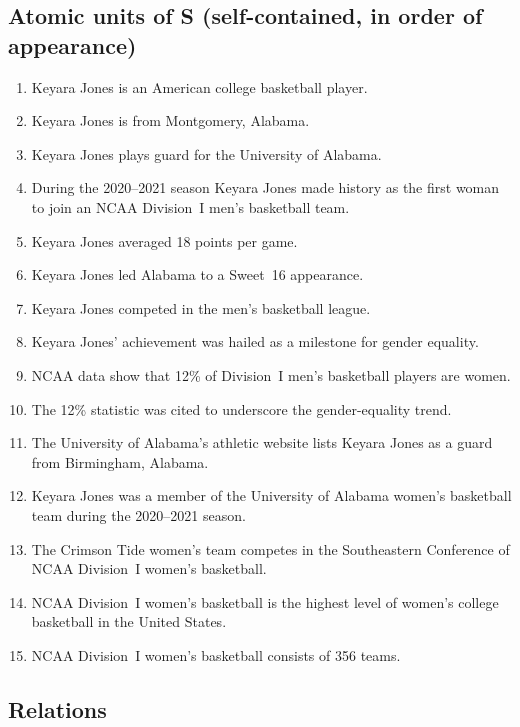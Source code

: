 \documentclass[11pt]{article}
\begin{document}
\subsection*{Atomic units of S (self-contained, in order of appearance)}
\begin{enumerate}[label=\textbf{S\arabic*.},leftmargin=*]
  \item Keyara Jones is an American college basketball player.
  \item Keyara Jones is from Montgomery, Alabama.
  \item Keyara Jones plays guard for the University of Alabama.
  \item During the 2020--2021 season Keyara Jones made history as the first woman to join an NCAA Division~I men's basketball team.
  \item Keyara Jones averaged 18 points per game.
  \item Keyara Jones led Alabama to a Sweet~16 appearance.
  \item Keyara Jones competed in the men's basketball league.
  \item Keyara Jones' achievement was hailed as a milestone for gender equality.
  \item NCAA data show that 12\% of Division~I men's basketball players are women.
  \item The 12\% statistic was cited to underscore the gender-equality trend.
  \item The University of Alabama's athletic website lists Keyara Jones as a guard from Birmingham, Alabama.
  \item Keyara Jones was a member of the University of Alabama women's basketball team during the 2020--2021 season.
  \item The Crimson Tide women's team competes in the Southeastern Conference of NCAA Division~I women's basketball.
  \item NCAA Division~I women's basketball is the highest level of women's college basketball in the United States.
  \item NCAA Division~I women's basketball consists of 356 teams.
\end{enumerate}

\subsection*{Relations}
\end{document}
